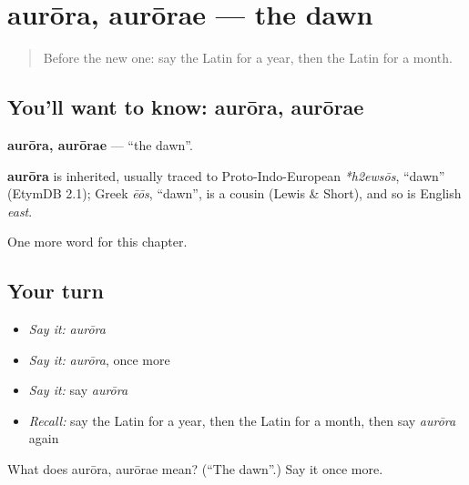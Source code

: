 \section[aurōra, aurōrae]{aurōra, aurōrae — the dawn}

\label{lesson:LA-C103-aurora}



\begin{quote}
Before the new one: say the Latin for a year, then the Latin for a month.
\end{quote}

\subsection*{You'll want to know: aurōra, aurōrae}
\textbf{aurōra, aurōrae} — \textquotedblleft{}the dawn\textquotedblright{}.

\begin{cousinweb}
\textbf{aurōra} is inherited, usually traced to Proto-Indo-European \emph{*h2ewsōs}, \textquotedblleft{}dawn\textquotedblright{} (EtymDB 2.1); Greek \emph{ēōs}, \textquotedblleft{}dawn\textquotedblright{}, is a cousin (Lewis \& Short), and so is English \emph{east}.
\end{cousinweb}

\begin{grammarlens}[title={What you've built}]
One more word for this chapter.
\end{grammarlens}

\subsection*{Your turn}
\begin{itemize}
\raggedright
  \item \emph{Say it:} \emph{aurōra}
  \item \emph{Say it:} \emph{aurōra}, once more
  \item \emph{Say it:} say \emph{aurōra}
  \item \emph{Recall:} say the Latin for a year, then the Latin for a month, then say \emph{aurōra} again
\end{itemize}

\begin{tcolorbox}[breakable,colback=teal!4,colframe=teal!35!black,title={Before you move on}]
What does aurōra, aurōrae mean? (\textquotedblleft{}The dawn\textquotedblright{}.) Say it once more.
\end{tcolorbox}
